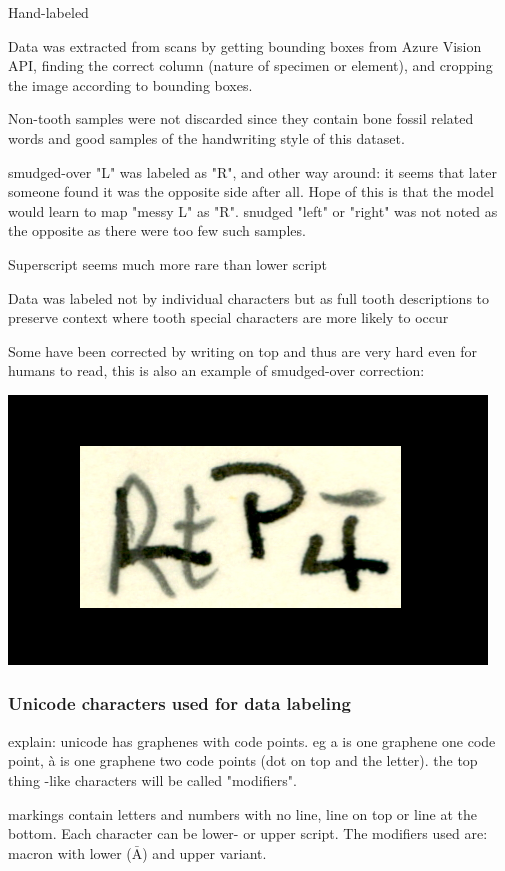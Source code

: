 \documentclass{article}
\begin{document}
Hand-labeled

Data was extracted from scans by getting bounding boxes from Azure Vision API,
finding the correct column (nature of specimen or element), and cropping the image 
according to bounding boxes.

Non-tooth samples were not discarded since they contain 
bone fossil related words and good samples of the handwriting style of this dataset.

smudged-over "L" was labeled as "R", and other way around: it seems that later 
someone found it was the opposite side after all. Hope of this is that the model 
would learn to map "messy L" as "R". snudged "left" or "right" was not noted as the 
opposite as there were too few such samples.

Superscript seems much more rare than lower script

Data was labeled not by individual characters but as full tooth descriptions
to preserve context where tooth special characters are more likely to occur

Some have been corrected by writing on top and thus are very hard 
even for humans to read, this is also an example of smudged-over correction: 

\includegraphics*[scale=0.2]{../images/superambiguous_data_sample.png}

\subsubsection{Unicode characters used for data labeling}

explain: unicode has graphenes with code points. eg a is one graphene one code point,
à is one graphene two code points (dot on top and the letter). the top thing -like characters will be called 
"modifiers".

markings contain letters and numbers with no line, line on top or line at the bottom.
Each character can be lower- or upper script. The modifiers used are: 
macron with lower ($\bar{\mathrm{A}}$) and upper variant.
\end{document}
